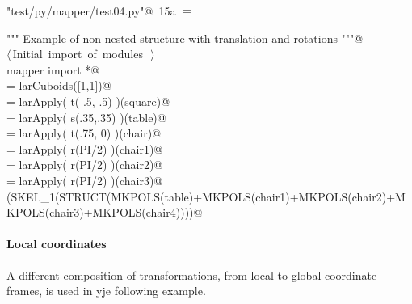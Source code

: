 \documentclass[11pt,oneside]{article}	%
\begin{document}
\begin{flushleft} \small \label{scrap30}
\protect{}\verb@"test/py/mapper/test04.py"@\nobreak\ {\footnotesize 15a }$\equiv$
\vspace{-1ex}
\begin{list}{}{} \item
\mbox{}\verb@""" Example of non-nested structure with translation and rotations """@\\
\mbox{}\verb@@\hbox{$\langle\,$Initial import of modules\nobreak\ {\footnotesize {}}$\,\rangle$}\verb@@\\
\mbox{}\verb@from mapper import *@\\
\mbox{}\verb@square = larCuboids([1,1])@\\
\mbox{}\verb@table = larApply( t(-.5,-.5) )(square)@\\
\mbox{}\verb@chair = larApply( s(.35,.35) )(table)@\\
\mbox{} = larApply( t(.75, 0) )(chair)@\\
\mbox{} = larApply( r(PI/2) )(chair1)@\\
\mbox{} = larApply( r(PI/2) )(chair2)@\\
\mbox{} = larApply( r(PI/2) )(chair3)@\\
\mbox{}\verb@VIEW(SKEL_1(STRUCT(MKPOLS(table)+MKPOLS(chair1)+MKPOLS(chair2)+MKPOLS(chair3)+MKPOLS(chair4))))@\\
\mbox{}\verb@@{\NWsep}
\end{list}
\vspace{-2ex}
\end{flushleft}

\paragraph{Local coordinates}
A different composition of transformations, from local to global coordinate frames, is used in yje following example.
\end{document}
